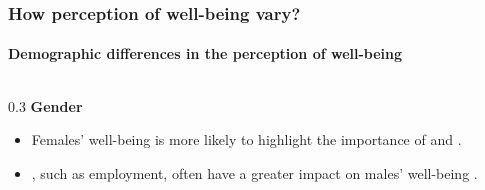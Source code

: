 \documentclass[
	aspectratio=169, %
	t, %
	onlytextwidth, %
	10pt, %
]{beamer}
\begin{document}
\begin{frame}
	\frametitle{How perception of well-being vary?}
	\framesubtitle{Demographic differences in the perception of well-being}
	\pause
	\small %
	
	\begin{columns}[T] %
		\begin{column}{0.3\linewidth} %
			\textbf{Gender}\\
			\begin{itemize}
			\item Females’ well-being is more likely to highlight the importance of  \citep{karasawa_cultural_2011,matud_gender_2019} and  \citep{van_der_meer_gender_2014}.
                \item {}, such as employment, often have a greater impact on males’ well-being \citep{van_der_meer_gender_2014}.
          

\end{itemize}
\end{column}
\end{columns}
\end{frame}
\end{document}
